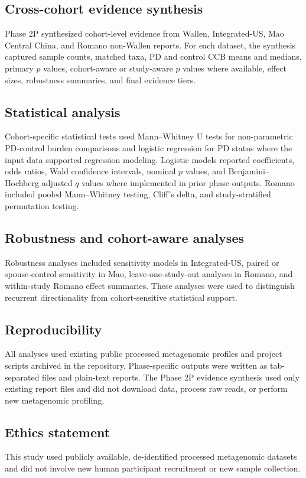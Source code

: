 \documentclass[12pt]{article}
\begin{document}
\subsection*{Cross-cohort evidence synthesis}
Phase 2P synthesized cohort-level evidence from Wallen, Integrated-US, Mao Central China, and Romano non-Wallen reports. For each dataset, the synthesis captured sample counts, matched taxa, PD and control CCB means and medians, primary $p$ values, cohort-aware or study-aware $p$ values where available, effect sizes, robustness summaries, and final evidence tiers.

\subsection*{Statistical analysis}
Cohort-specific statistical tests used Mann--Whitney U tests for non-parametric PD-control burden comparisons and logistic regression for PD status where the input data supported regression modeling. Logistic models reported coefficients, odds ratios, Wald confidence intervals, nominal $p$ values, and Benjamini--Hochberg adjusted $q$ values where implemented in prior phase outputs. Romano included pooled Mann--Whitney testing, Cliff's delta, and study-stratified permutation testing.

\subsection*{Robustness and cohort-aware analyses}
Robustness analyses included sensitivity models in Integrated-US, paired or spouse-control sensitivity in Mao, leave-one-study-out analyses in Romano, and within-study Romano effect summaries. These analyses were used to distinguish recurrent directionality from cohort-sensitive statistical support.

\subsection*{Reproducibility}
All analyses used existing public processed metagenomic profiles and project scripts archived in the repository. Phase-specific outputs were written as tab-separated files and plain-text reports. The Phase 2P evidence synthesis used only existing report files and did not download data, process raw reads, or perform new metagenomic profiling.

\subsection*{Ethics statement}
This study used publicly available, de-identified processed metagenomic datasets and did not involve new human participant recruitment or new sample collection.
\end{document}
